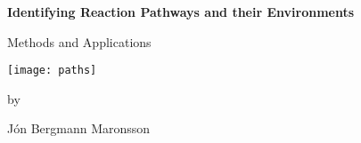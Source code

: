 \begin{titlepage}

%
%


\vspace*{\fill}
\centerline{\LARGE{\textbf{Identifying Reaction Pathways and their Environments}}}
\vspace{1em}
\centerline{Methods and Applications}

\vspace{5em}

\centering
\texttt{[image: paths]}
\vspace{5em}

\centerline{\small{by}}
\vspace{1em}
\centerline{J\'on Bergmann Maronsson}
\vspace*{\fill}

\end{titlepage}
